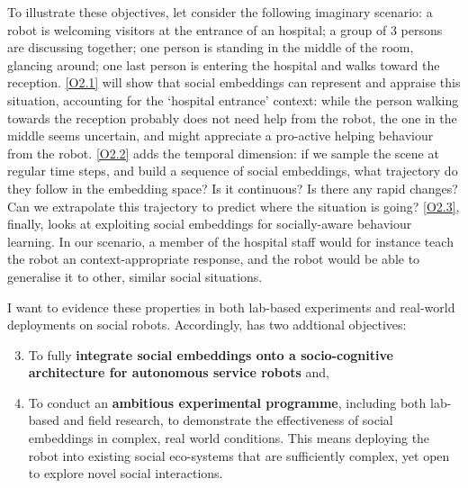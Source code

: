 \begin{rewrite}
\begin{enumerate}[label=\textbf{(\arabic*)}]
\begin{enumerate}[label=\textbf{O2.\arabic*}]
\end{enumerate}
\end{enumerate}

\noindent To illustrate these objectives, let consider the following imaginary
scenario: a robot is welcoming visitors at the entrance of an hospital; a group
of 3 persons are discussing together; one person is standing in the middle of
the room, glancing around; one last person is entering the hospital and
walks toward the reception. \ref{O2.1} will show that social embeddings can
represent and appraise this situation, accounting for the `hospital entrance' context: while
the person walking towards the reception probably does not need help from the
robot, the one in the middle seems uncertain, and might appreciate a pro-active
helping behaviour from the robot. \ref{O2.2} adds the temporal dimension: if we
sample the scene at regular time steps, and build a sequence of social
embeddings, what trajectory do they follow in the embedding space? Is it
continuous? Is there any rapid changes? Can we extrapolate this trajectory to
predict where the situation is going? \ref{O2.3}, finally, looks at exploiting
social embeddings for socially-aware behaviour learning. In our scenario, a
member of the hospital staff would for instance teach the robot an
context-appropriate response, and the robot would be able to generalise it to
other, similar social situations.


I want to evidence these properties in both lab-based experiments and
real-world deployments on social robots. Accordingly, \project has two addtional
objectives:

\begin{enumerate}[label=\textbf{O\arabic*}]
    \setcounter{enumi}{2}
    \item \label{O3} To fully {\bf integrate social embeddings onto a
        socio-cognitive architecture for autonomous service robots} and,

    \item \label{O4} To conduct an {\bf ambitious experimental programme},
        including both lab-based and field research, to demonstrate the
        effectiveness of social embeddings in complex, real world conditions.
        This means deploying the \project robot into existing social eco-systems
        that are sufficiently complex, yet open to explore novel social interactions.
\end{enumerate}


\end{rewrite}

